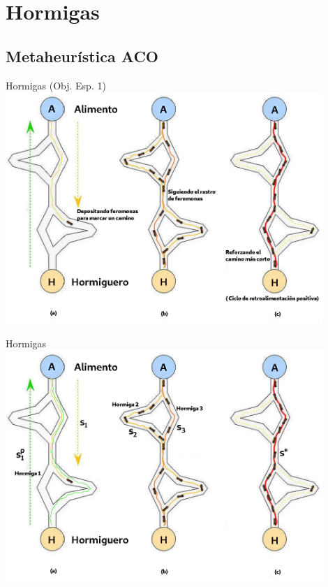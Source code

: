 \section{Hormigas}
\subsection{Metaheur\'istica ACO }
\begin{frame}{Hormigas (Obj. Esp. 1)}
\includegraphics[width=0.9\textwidth]{Pictures/ACO-ant.png}
\end{frame}

\begin{frame}{Hormigas}
\centering
\includegraphics[width=0.9\textwidth]{Pictures/ACO-ant-2.png}
\end{frame}

